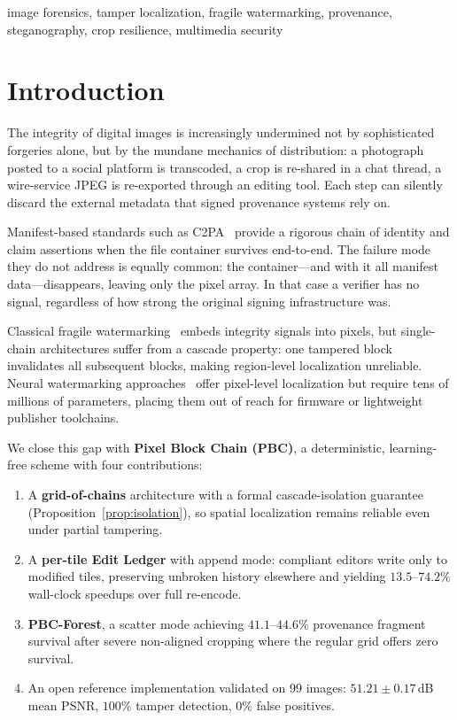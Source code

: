 \documentclass[conference]{IEEEtran}
\begin{document}
\begin{IEEEkeywords}
image forensics, tamper localization, fragile watermarking,
provenance, steganography, crop resilience, multimedia security
\end{IEEEkeywords}

\section{Introduction}
\label{sec:intro}

The integrity of digital images is increasingly undermined not by
sophisticated forgeries alone, but by the mundane mechanics of
distribution: a photograph posted to a social platform is transcoded,
a crop is re-shared in a chat thread, a wire-service JPEG is re-exported
through an editing tool. Each step can silently discard the external
metadata that signed provenance systems rely on.

Manifest-based standards such as C2PA~\cite{c2pa_spec} provide a rigorous
chain of identity and claim assertions when the file container survives
end-to-end. The failure mode they do not address is equally common: the
container---and with it all manifest data---disappears, leaving only the
pixel array. In that case a verifier has no signal, regardless of how
strong the original signing infrastructure was.

Classical fragile watermarking~\cite{he2008blockchain,fang2020blockchain}
embeds integrity signals into pixels, but single-chain architectures
suffer from a cascade property: one tampered block invalidates all
subsequent blocks, making region-level localization unreliable. Neural
watermarking approaches~\cite{editguard,omniguard} offer pixel-level
localization but require tens of millions of parameters, placing them out
of reach for firmware or lightweight publisher toolchains.

We close this gap with \textbf{Pixel Block Chain (PBC)}, a deterministic,
learning-free scheme with four contributions:

\begin{enumerate}
  \item A \textbf{grid-of-chains} architecture with a formal
    cascade-isolation guarantee (Proposition~\ref{prop:isolation}), so
    spatial localization remains reliable even under partial tampering.

  \item A \textbf{per-tile Edit Ledger} with append mode: compliant
    editors write only to modified tiles, preserving unbroken history
    elsewhere and yielding $13.5$--$74.2\%$ wall-clock speedups over
    full re-encode.

  \item \textbf{PBC-Forest}, a scatter mode achieving $41.1$--$44.6\%$
    provenance fragment survival after severe non-aligned cropping where
    the regular grid offers zero survival.

  \item An open reference implementation validated on 99 images:
    $51.21 \pm 0.17$\,dB mean PSNR, $100\%$ tamper detection,
    $0\%$ false positives.
\end{enumerate}
\end{document}
